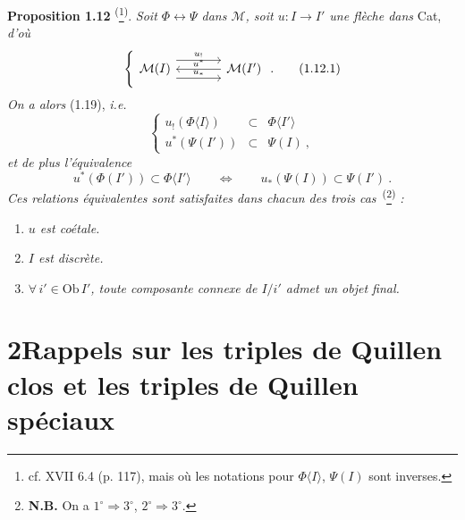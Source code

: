\documentclass[11pt]{article}
\newcommand{\printedpage}[1]{\marginpar{\footnotesize p.~#1}}
\newcommand{\msp}[1]{\marginpar{\footnotesize [#1]}}
\newcommand{\clos}{\longleftrightarrow}
\newcommand{\fl}{\longrightarrow}
\begin{document}
\textbf{Proposition 1.12} \textsuperscript{(}\footnote[5]{cf. XVII 6.4 (p. 117), mais où les notations pour $\Phi\langle I\rangle$, $\Psi(I)$ sont inverses.}\textsuperscript{)}. \textit{Soit $\Phi \clos \Psi$ dans $\mathcal{M}$, soit $u : I \fl I'$ une flèche dans} Cat, \textit{d'où}
\[
\left\{
\begin{tikzcd}[column sep=large]
\mathcal{M}(I) \arrow[r, shift left=3, "u_{!}"] \arrow[r, shift right=3, "u_{*}"] & \mathcal{M}(I') \arrow[l, "u^{*}"']
\end{tikzcd}
\right.
.
\tag*{(1.12.1)}
\]
\printedpage{8}
\textit{On a alors} (1.19), \textit{i.e.}
\[
\left\{
\begin{array}{rcl}
u_{!}(\Phi\langle I\rangle) & \subset & \Phi\langle I'\rangle \\
u^{*}(\Psi(I')) & \subset & \Psi(I)\ ,
\end{array}
\right.
\tag*{(1.13.1)}
\]
\textit{et de plus l'équivalence}
\[
u^{*}(\Phi(I')) \subset \Phi\langle I'\rangle \qquad \Longleftrightarrow \qquad u_{*}(\Psi(I)) \subset \Psi(I')\ . \tag*{(1.13.2)}
\]
\textit{Ces relations équivalentes sont satisfaites dans chacun des trois cas}~\textsuperscript{(}\footnote[6]{\textbf{N.B.} On a $1^{\circ} \Longrightarrow 3^{\circ}$, $2^{\circ} \Longrightarrow 3^{\circ}$.}\textsuperscript{)} \textit{:}
\begin{enumerate}[label={}]
\item[1°)] \textit{$u$ est coétale.}
\item[2°)] \textit{$I$ est discrète.}
\item[3°)] $\forall\, i' \in \mathrm{Ob}\, I'$\textit{, toute composante connexe de $I/i'$ admet un objet final.}
\end{enumerate}
\msp{page 13}

\section*{2\quad Rappels sur les triples de Quillen clos et les triples de Quillen spéciaux}
\end{document}
